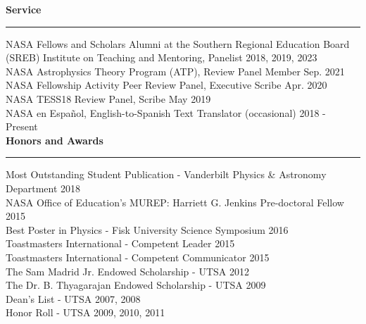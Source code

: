 \documentclass[letter,12pt]{article}
\begin{document}
\noindent
{\bf Service} \\
\vspace{-10mm}
\begin{center}
\rule{\textwidth}{0.2mm}
\end{center}
\vspace{-3mm}
\noindent
NASA Fellows and Scholars Alumni at the Southern Regional Education Board (SREB) Institute on Teaching and Mentoring, Panelist \hfill 2018, 2019, 2023 \\
NASA Astrophysics Theory Program (ATP), Review Panel Member \hfill Sep. 2021 \\
NASA Fellowship Activity Peer Review Panel, Executive Scribe \hfill Apr. 2020 \\
NASA TESS18 Review Panel, Scribe \hfill May 2019 \\
NASA en Español, English-to-Spanish Text Translator (occasional) \hfill 2018 - Present \\





\noindent
{\bf Honors and Awards} \\
\vspace{-10mm}
\begin{center}
\rule{\textwidth}{0.2mm}
\end{center}
\vspace{-3mm}
\noindent
Most Outstanding Student Publication - Vanderbilt Physics \& Astronomy Department \hfill 2018 \\
NASA Office of Education's MUREP: Harriett G. Jenkins Pre-doctoral Fellow \hfill 2015 \\
Best Poster in Physics - Fisk University Science Symposium \hfill 2016 \\
Toastmasters International - Competent Leader \hfill 2015 \\
Toastmasters International - Competent Communicator \hfill 2015 \\
The Sam Madrid Jr. Endowed Scholarship - UTSA \hfill 2012 \\
The Dr. B. Thyagarajan Endowed Scholarship - UTSA \hfill 2009 \\
Dean’s List - UTSA \hfill 2007, 2008 \\
Honor Roll - UTSA \hfill 2009, 2010, 2011 \\
\end{document}
